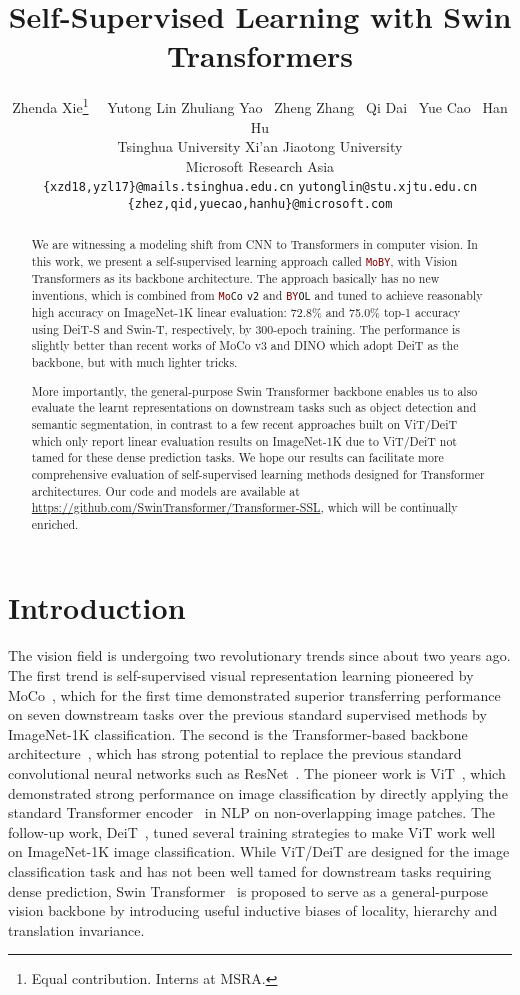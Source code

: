 \documentclass{article}
\title{Self-Supervised Learning with Swin Transformers}
\author{
   Zhenda Xie\thanks{Equal contribution. Interns at MSRA.}~~ Yutong Lin Zhuliang Yao ~Zheng Zhang ~Qi Dai ~Yue Cao ~Han Hu\\
   Tsinghua University \quad Xi'an Jiaotong University \\
   Microsoft Research Asia \\
   \texttt{\{xzd18,yzl17\}@mails.tsinghua.edu.cn} \quad  \texttt{yutonglin@stu.xjtu.edu.cn} \\
   \texttt{\{zhez,qid,yuecao,hanhu\}@microsoft.com}
}
\begin{document}
\maketitle

\begin{abstract}

We are witnessing a modeling shift from CNN to Transformers in computer vision. In this work, we present a self-supervised learning approach called \textcolor{Maroon}{\texttt{MoBY}}, with Vision Transformers as its backbone architecture. The approach basically has no new inventions, which is combined from \textcolor{Maroon}{\texttt{Mo}}\texttt{Co} \texttt{v2} and \textcolor{Maroon}{\texttt{BY}}\texttt{OL} and tuned to achieve reasonably high accuracy on ImageNet-1K linear evaluation: 72.8\% and 75.0\% top-1 accuracy using DeiT-S and Swin-T, respectively, by 300-epoch training. The performance is slightly better than recent works of MoCo v3 and DINO which adopt DeiT as the backbone, but with much lighter tricks. 

More importantly, the general-purpose Swin Transformer backbone enables us to also evaluate the learnt representations on downstream tasks such as object detection and semantic segmentation, in contrast to a few recent approaches built on ViT/DeiT which only report linear evaluation results on ImageNet-1K due to ViT/DeiT not tamed for these dense prediction tasks. We hope our results can facilitate more comprehensive evaluation of self-supervised learning methods designed for Transformer architectures. Our code and models are available at \url{https://github.com/SwinTransformer/Transformer-SSL}, which will be continually enriched. 

\end{abstract}

\section{Introduction}

The vision field is undergoing two revolutionary trends since about two years ago. The first trend is self-supervised visual representation learning pioneered by MoCo~\citep{moco}, which for the first time demonstrated superior transferring performance on seven downstream tasks over the previous standard supervised methods by ImageNet-1K classification. The second is the Transformer-based backbone architecture~\citep{vit,deit,swin}, which has strong potential to replace the previous standard convolutional neural networks such as ResNet~\citep{resnet}. The pioneer work is ViT~\citep{vit}, which demonstrated strong performance on image classification by directly applying the standard Transformer encoder~\citep{attention} in NLP on non-overlapping image patches. The follow-up work, DeiT~\citep{deit}, tuned several training strategies to make ViT work well on ImageNet-1K image classification. While ViT/DeiT are designed for the image classification task and has not been well tamed for downstream tasks requiring dense prediction, Swin Transformer~\citep{swin} is proposed to serve as a general-purpose vision backbone by introducing useful inductive biases of locality, hierarchy and translation invariance.
\end{document}
